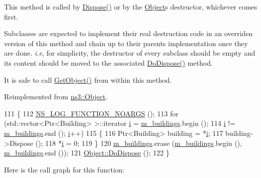 This method is called by \hyperlink{classns3_1_1Object_aa90ae598863f6c251cdab3c3722afdaf}{Dispose()} or by the \hyperlink{classns3_1_1Object}{Object}\textquotesingle{}s destructor, whichever comes first.

Subclasses are expected to implement their real destruction code in an overriden version of this method and chain up to their parent\textquotesingle{}s implementation once they are done. {\itshape i.\+e}, for simplicity, the destructor of every subclass should be empty and its content should be moved to the associated \hyperlink{classns3_1_1BuildingListPriv_a944c0d54edfc767d2d80e4a83f8c56cc}{Do\+Dispose()} method.

It is safe to call \hyperlink{classns3_1_1Object_a13e18c00017096c8381eb651d5bd0783}{Get\+Object()} from within this method. 

Reimplemented from \hyperlink{classns3_1_1Object_a475d429a75d302d4775f4ae32479b287}{ns3\+::\+Object}.


\begin{DoxyCode}
111 \{
112   \hyperlink{log-macros-disabled_8h_a8f7e4afc291c9d29a65c18ac1f79197b}{NS\_LOG\_FUNCTION\_NOARGS} ();
113   \textcolor{keywordflow}{for} (std::vector<Ptr<Building> >::iterator \hyperlink{bernuolliDistribution_8m_a6f6ccfcf58b31cb6412107d9d5281426}{i} = \hyperlink{classns3_1_1BuildingListPriv_a02b34db9f6e8aafa9d21c19b8322a1bf}{m\_buildings}.begin ();
114        \hyperlink{bernuolliDistribution_8m_a6f6ccfcf58b31cb6412107d9d5281426}{i} != \hyperlink{classns3_1_1BuildingListPriv_a02b34db9f6e8aafa9d21c19b8322a1bf}{m\_buildings}.end (); \hyperlink{bernuolliDistribution_8m_a6f6ccfcf58b31cb6412107d9d5281426}{i}++)
115     \{
116       Ptr<Building> building = *\hyperlink{bernuolliDistribution_8m_a6f6ccfcf58b31cb6412107d9d5281426}{i};
117       building->Dispose ();
118       *\hyperlink{bernuolliDistribution_8m_a6f6ccfcf58b31cb6412107d9d5281426}{i} = 0;
119     \}
120   \hyperlink{classns3_1_1BuildingListPriv_a02b34db9f6e8aafa9d21c19b8322a1bf}{m\_buildings}.erase (\hyperlink{classns3_1_1BuildingListPriv_a02b34db9f6e8aafa9d21c19b8322a1bf}{m\_buildings}.begin (), \hyperlink{classns3_1_1BuildingListPriv_a02b34db9f6e8aafa9d21c19b8322a1bf}{m\_buildings}.end ());
121   \hyperlink{classns3_1_1Object_a475d429a75d302d4775f4ae32479b287}{Object::DoDispose} ();
122 \}
\end{DoxyCode}


Here is the call graph for this function\+:


